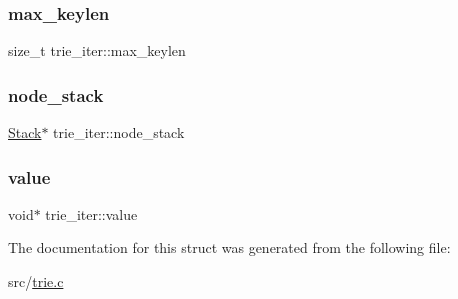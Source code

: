 \mbox{\label{structtrie__iter_add40401793ab6e342863b7747af165d1}} 
\subsubsection{\texorpdfstring{max\_keylen}{max\_keylen}}
{\footnotesize\ttfamily size\+\_\+t trie\+\_\+iter\+::max\+\_\+keylen}

\mbox{\label{structtrie__iter_a64c95d56b672bb241db8e24c438e6f07}} 
\subsubsection{\texorpdfstring{node\_stack}{node\_stack}}
{\footnotesize\ttfamily \mbox{\hyperlink{stack_8c_a2ef239a3a7982dbfb73694e0d427bae7}{Stack}}$\ast$ trie\+\_\+iter\+::node\+\_\+stack}

\mbox{\label{structtrie__iter_a6b9dbd03ea4c0c5e909ab8608633fe1b}} 
\subsubsection{\texorpdfstring{value}{value}}
{\footnotesize\ttfamily void$\ast$ trie\+\_\+iter\+::value}



The documentation for this struct was generated from the following file\+:\begin{DoxyCompactItemize}
\item 
src/\mbox{\hyperlink{trie_8c}{trie.\+c}}\end{DoxyCompactItemize}
